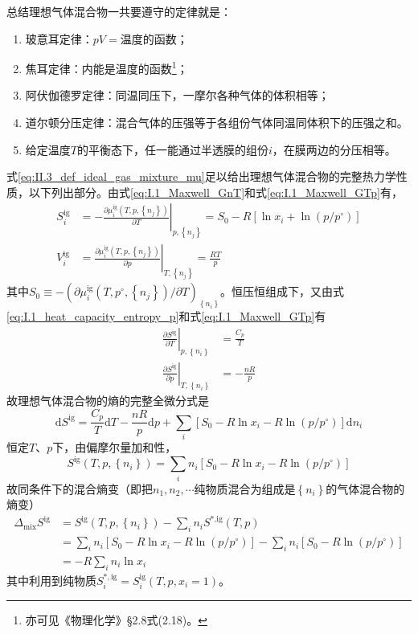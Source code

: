 \documentclass[main.tex]{subfiles}
\begin{document}
总结理想气体混合物一共要遵守的定律就是：
\begin{enumerate}
    \item 玻意耳定律：$pV=\text{温度的函数}$；
    \item 焦耳定律：内能是温度的函数\footnote{亦可见《物理化学》\S 2.8式(2.18)。}；
    \item 阿伏伽德罗定律：同温同压下，一摩尔各种气体的体积相等；
    \item 道尔顿分压定律：混合气体的压强等于各组份气体同温同体积下的压强之和。
    \item 给定温度$T$的平衡态下，任一能通过半透膜的组份$i$，在膜两边的分压相等。
\end{enumerate}

式\eqref{eq:II.3_def_ideal_gas_mixture_mu}足以给出理想气体混合物的完整热力学性质，以下列出部分。由式\eqref{eq:I.1_Maxwell_GnT}和式\eqref{eq:I.1_Maxwell_GTp}有，
\begin{align}
    S^\text{ig}_i & =-\left.\frac{\partial \mu^\text{ig}_i\left(T,p,\left\{n_j\right\}\right)}{\partial T}\right|_{p,\left\{n_j\right\}}=S_0-R\left[\ln x_i+\ln \left(p/p^\circ\right)\right] \\
    V^\text{ig}_i & =\left.\frac{\partial\mu^\text{ig}_i\left(T,p,\left\{n_j\right\}\right)}{\partial p}\right|_{T,\left\{n_j\right\}}=\frac{RT}{p}
\end{align}
其中$S_0\equiv-\left(\partial\mu_i^\text{ig}\left(T,p^\circ,\left\{n_j\right\}\right)/\partial T\right)_{\left\{n_i\right\}}$。恒压恒组成下，又由式\eqref{eq:I.1_heat_capacity_entropy_p}和式\eqref{eq:I.1_Maxwell_GTp}有
\begin{align}
    \left.\frac{\partial S^\text{ig}}{\partial T}\right|_{p,\left\{n_i\right\}} & =\frac{C_p}{T} \\
    \left.\frac{\partial S^\text{ig}}{\partial p}\right|_{T,\left\{n_i\right\}} & =-\frac{nR}{p}
\end{align}
故理想气体混合物的熵的完整全微分式是
\[\mathrm{d}S^\text{ig}=\frac{C_p}{T}\mathrm{d}T-\frac{nR}{p}\mathrm{d}p+\sum_i\left[S_0-R\ln x_i-R\ln\left(p/p^\circ\right)\right]\mathrm{d}n_i\]
恒定$T$、$p$下，由偏摩尔量加和性，
\[S^\text{ig}\left(T,p,\left\{n_i\right\}\right)=\sum_in_i\left[S_0-R\ln x_i-R\ln\left(p/ p^\circ\right)\right]\]
故同条件下的混合熵变（即把$n_1,n_2,\cdots$纯物质混合为组成是$\left\{n_i\right\}$的气体混合物的熵变）
\begin{align*}
    \Delta_\text{mix}S^\text{ig} & =S^\text{ig}\left(T,p,\left\{n_i\right\}\right)-\sum_i n_i S^\text{*,ig}\left(T,p\right)                            \\
                                 & =\sum_in_i\left[S_0-R\ln x_i-R\ln\left(p/p^\circ\right)\right]-\sum_in_i\left[S_0-R\ln\left(p/p^\circ\right)\right] \\
                                 & =-R\sum_in_i\ln x_i
\end{align*}
其中利用到纯物质$S_i^{*,\text{ig}}=S_i^\text{ig}\left(T,p,x_i=1\right)$。
\end{document}
